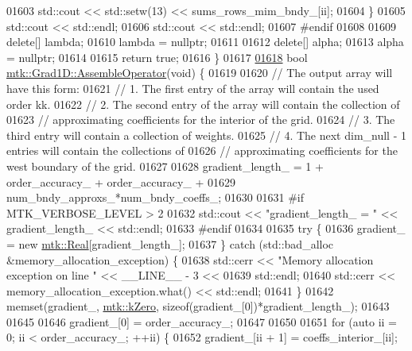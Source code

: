 \begin{DoxyCode}
{{01603     std::cout << std::setw(13) << sums\_rows\_mim\_bndy\_[ii];
01604   \}
01605   std::cout << std::endl;
01606   std::cout << std::endl;
01607 \textcolor{preprocessor}{  #endif}
01608 
01609   \textcolor{keyword}{delete}[] lambda;
01610   lambda = \textcolor{keyword}{nullptr};
01611 
01612   \textcolor{keyword}{delete}[] alpha;
01613   alpha = \textcolor{keyword}{nullptr};
01614 
01615   \textcolor{keywordflow}{return} \textcolor{keyword}{true};
01616 \}
01617 
\hypertarget{mtk__grad__1d_8cc_source_l01618}{}\hyperlink{classmtk_1_1Grad1D_a4eb4d363506b8c64b2bb18a318bbd259}{01618} \textcolor{keywordtype}{bool} \hyperlink{classmtk_1_1Grad1D_a4eb4d363506b8c64b2bb18a318bbd259}{mtk::Grad1D::AssembleOperator}(\textcolor{keywordtype}{void}) \{
01619 
01620   \textcolor{comment}{// The output array will have this form:}
01621   \textcolor{comment}{// 1. The first entry of the array will contain the used order kk.}
01622   \textcolor{comment}{// 2. The second entry of the array will contain the collection of}
01623   \textcolor{comment}{// approximating coefficients for the interior of the grid.}
01624   \textcolor{comment}{// 3. The third entry will contain a collection of weights.}
01625   \textcolor{comment}{// 4. The next dim\_null - 1 entries will contain the collections of}
01626   \textcolor{comment}{// approximating coefficients for the west boundary of the grid.}
01627 
01628   gradient\_length\_ = 1 + order\_accuracy\_ + order\_accuracy\_ +
01629     num\_bndy\_approxs\_*num\_bndy\_coeffs\_;
01630 
01631 \textcolor{preprocessor}{  #if MTK\_VERBOSE\_LEVEL > 2}
01632   std::cout << \textcolor{stringliteral}{"gradient\_length\_ = "} << gradient\_length\_ << std::endl;
01633 \textcolor{preprocessor}{  #endif}
01634 
01635   \textcolor{keywordflow}{try} \{
01636     gradient\_ = \textcolor{keyword}{new} \hyperlink{group__c01-roots_gac080bbbf5cbb5502c9f00405f894857d}{mtk::Real}[gradient\_length\_];
01637   \} \textcolor{keywordflow}{catch} (std::bad\_alloc &memory\_allocation\_exception) \{
01638     std::cerr << \textcolor{stringliteral}{"Memory allocation exception on line "} << \_\_LINE\_\_ - 3 <<
01639       std::endl;
01640     std::cerr << memory\_allocation\_exception.what() << std::endl;
01641   \}
01642   memset(gradient\_, \hyperlink{group__c01-roots_ga59a451a5fae30d59649bcda274fea271}{mtk::kZero}, \textcolor{keyword}{sizeof}(gradient\_[0])*gradient\_length\_);
01643 
01645 
01646   gradient\_[0] = order\_accuracy\_;
01647 
01650 
01651   \textcolor{keywordflow}{for} (\textcolor{keyword}{auto} ii = 0; ii < order\_accuracy\_; ++ii) \{
01652     gradient\_[ii + 1] = coeffs\_interior\_[ii];
}}
\end{DoxyCode}
